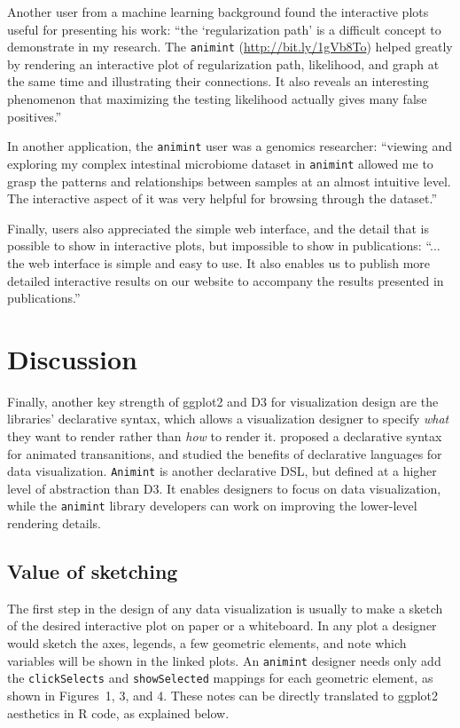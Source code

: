 \documentclass[journal]{vgtc}\usepackage[]{graphicx}\usepackage[]{color}
\begin{document}
Another user from a machine learning background found the interactive
plots useful for presenting his work: ``the `regularization path' is a
difficult concept to demonstrate in my research. The \texttt{animint}
(\url{http://bit.ly/1gVb8To}) helped greatly by rendering an
interactive plot of regularization path, likelihood, and graph at the
same time and illustrating their connections. It also reveals an
interesting phenomenon that maximizing the testing likelihood actually
gives many false positives.''

In another application, the \texttt{animint} user was a genomics researcher:
``viewing and exploring my complex intestinal microbiome dataset in
\texttt{animint} allowed me to grasp the patterns and relationships between
samples at an almost intuitive level. The interactive aspect of it was
very helpful for browsing through the dataset.''

Finally, users also appreciated the simple web interface, and the
detail that is possible to show in interactive plots, but impossible
to show in publications: ``...  the web interface is simple and easy
to use.  It also enables us to publish more detailed interactive
results on our website to accompany the results presented in
publications.''

\section{Discussion}

Finally, another key strength of ggplot2 and D3 for visualization
design are the libraries' declarative syntax, which allows a
visualization designer to specify \emph{what} they want to render
rather than \emph{how} to render it. \citet{declarative} proposed a
declarative syntax for animated transanitions, and studied the
benefits of declarative languages for data visualization. \texttt{Animint} is
another declarative DSL, but defined at a higher level of abstraction
than D3. It enables designers to focus on data visualization, while
the \texttt{animint} library developers can work on improving the lower-level
rendering details.

\subsection{Value of sketching}

The first step in the design of any data visualization is usually to
make a sketch of the desired interactive plot on paper or a
whiteboard.  In any plot a designer would sketch the axes, legends, a
few geometric elements, and note which variables will be shown in the
linked plots. An \texttt{animint} designer needs only add the
\texttt{clickSelects} and \texttt{showSelected} mappings for
each geometric element, as shown in Figures~1, 3, and 4. These notes
can be directly translated to ggplot2 aesthetics in R code, as
explained below.
\end{document}
